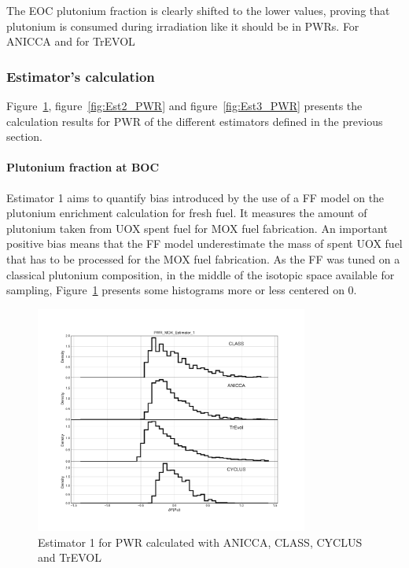 The EOC plutonium fraction is clearly shifted to the lower values, proving that plutonium is consumed during irradiation like it should be in PWRs. For ANICCA and for TrEVOL    

\subsubsection{Estimator's calculation}

Figure~\ref{fig:Est1_PWR}, figure~\ref{fig:Est2_PWR} and figure~\ref{fig:Est3_PWR} presents the calculation results for PWR of the different estimators defined in the previous section. 

\paragraph{Plutonium fraction at BOC}
Estimator 1 aims to quantify bias introduced by the use of a FF model on the plutonium enrichment calculation for fresh fuel. It measures the amount of plutonium taken from UOX spent fuel for MOX fuel fabrication. An important positive bias means that the FF model underestimate the mass of spent UOX fuel that has to be processed for the MOX fuel fabrication. As the FF was tuned on a classical plutonium composition, in the middle of the isotopic space available for sampling, Figure~\ref{fig:Est1_PWR} presents some histograms more or less centered on 0.


\begin{figure}[h]
	\begin{center}
		\includegraphics[width = 0.8\textwidth]{../../Feature_1/RAW_DATA/FIG/PWR_MOX_Estimator_1.pdf}
		\caption{Estimator 1 for PWR calculated with ANICCA, CLASS, CYCLUS and TrEVOL}
		\label{fig:Est1_PWR}
	\end{center}
\end{figure}


